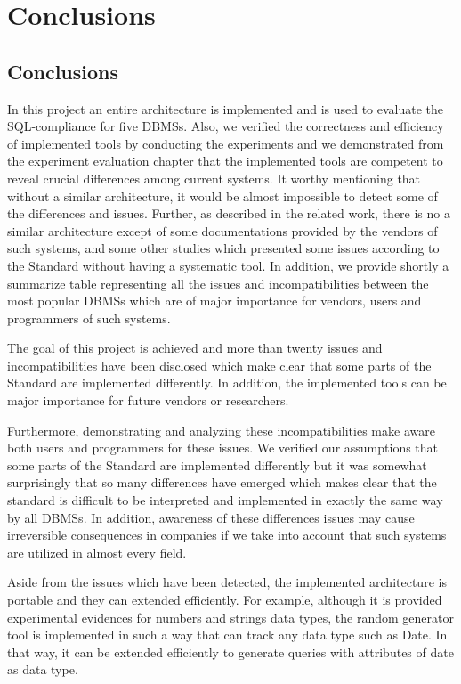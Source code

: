 \chapter{Conclusions}

\section{Conclusions}

In this project an entire architecture is implemented and is used to evaluate the SQL-compliance for five DBMSs. Also, we verified the correctness and efficiency of implemented tools by conducting the experiments and we demonstrated from the experiment evaluation chapter that the implemented tools are competent to reveal crucial differences among current systems. It worthy mentioning that without a similar architecture, it would be almost impossible to detect some of the differences and issues. Further, as described in the related work, there is no a similar architecture except of some documentations provided by the vendors of such systems, and some other studies which presented some issues according to the Standard without having a systematic tool. In addition, we provide shortly a summarize table representing all the issues and incompatibilities between the most popular DBMSs which are of major importance for vendors, users and programmers of such systems.  

The goal of this project is achieved and more than twenty issues and incompatibilities have been disclosed which make clear that some parts of the Standard are implemented differently. In addition, the implemented tools can be major importance for future vendors or researchers.

Furthermore, demonstrating and analyzing these incompatibilities make aware both users and programmers for these issues. We verified our assumptions that some parts of the Standard are implemented differently but it was somewhat surprisingly that so many differences have emerged which makes clear that the standard is difficult to be interpreted and implemented in exactly the same way by all DBMSs. In addition, awareness of these differences issues may cause irreversible consequences in companies if we take into account that such systems are utilized in almost every field.  

Aside from the issues which have been detected, the implemented architecture is portable and they can extended efficiently. For example, although it is provided experimental evidences for numbers and strings data types, the random generator tool is implemented in such a way that can track any data type such as Date. In that way, it can be extended efficiently to generate queries with attributes of date as data type. 


